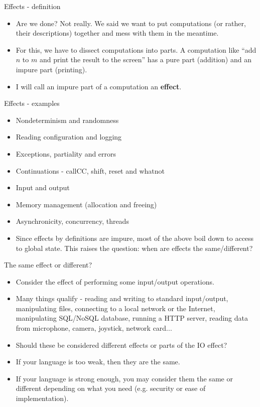 \documentclass{beamer}
\begin{document}
\begin{frame}{Effects - definition}
\begin{itemize}
	\item Are we done? Not really. We said we want to put computations (or rather, their descriptions) together and mess with them in the meantime.
	\item For this, we have to dissect computations into parts. A computation like ``add $n$ to $m$ and print the result to the screen'' has a pure part (addition) and an impure part (printing).
	\item I will call an impure part of a computation an \textbf{effect}.
\end{itemize}
\end{frame}

\begin{frame}{Effects - examples}
\begin{itemize}
	\item Nondeterminism and randomness
	\item Reading configuration and logging
	\item Exceptions, partiality and errors
	\item Continuations - callCC, shift, reset and whatnot
	\item Input and output
	\item Memory management (allocation and freeing)
	\item Asynchronicity, concurrency, threads
	\item Since effects by definitions are impure, most of the above boil down to access to global state. This raises the question: when are effects the same/different?
\end{itemize}
\end{frame}

\begin{frame}{The same effect or different?}
\begin{itemize}
	\item Consider the effect of performing some input/output operations.
	\item Many things qualify - reading and writing to standard input/output, manipulating files, connecting to a local network or the Internet, manipulating SQL/NoSQL database, running a HTTP server, reading data from microphone, camera, joystick, network card...
	\item Should these be considered different effects or parts of the IO effect?
	\item If your language is too weak, then they are the same.
	\item If your language is strong enough, you may consider them the same or different depending on what you need (e.g. security or ease of implementation).
\end{itemize}
\end{frame}
\end{document}
